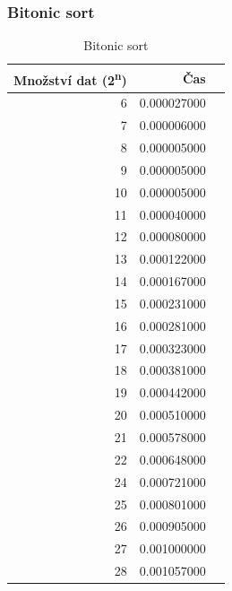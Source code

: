 \documentclass[12pt]{article}
\begin{document}
\subsubsection{Bitonic sort}
\begin{table}[H]
\begin{center}
\begin{tabular}{|r|r|r|}
\hline Množství dat (2\textsuperscript{n}) & Čas \\ \hline

6  &   0.000027000  \\ \hline
7  &   0.000006000  \\ \hline
8  &   0.000005000  \\ \hline
9  &   0.000005000  \\ \hline
10 &   0.000005000  \\ \hline
11 &   0.000040000  \\ \hline
12 &   0.000080000  \\ \hline
13 &   0.000122000  \\ \hline
14 &   0.000167000  \\ \hline
15 &   0.000231000  \\ \hline
16 &   0.000281000  \\ \hline
17 &   0.000323000  \\ \hline
18 &   0.000381000  \\ \hline
19 &   0.000442000  \\ \hline
20 &   0.000510000  \\ \hline
21 &   0.000578000  \\ \hline
22 &   0.000648000  \\ \hline
24 &   0.000721000  \\ \hline
25 &   0.000801000  \\ \hline
26 &   0.000905000  \\ \hline
27 &   0.001000000  \\ \hline
28 &   0.001057000  \\ \hline
\end{tabular} 
\end{center}
\caption{Bitonic sort}
\end{table} 
\end{document}
